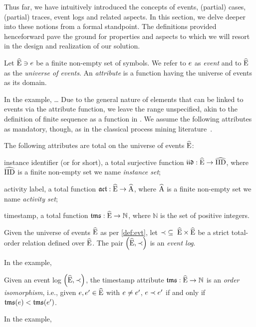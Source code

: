\begin{newj}
Thus far, we have intuitively introduced the concepts of events, (partial) cases, (partial) traces, event logs and related aspects.
In this section, we delve deeper into these notions from a formal standpoint. The definitions provided henceforward pave the ground for properties and aspects to which we will resort in the design and realization of our solution.

\begin{definition}[Event]\label{def:evt}
	Let $\widehat{\mathrm{E}} \ni e$ be a finite non-empty set of symbols. We refer to $e$ as \emph{event} and to $\widehat{\mathrm{E}}$ as the \emph{universe of events}.
	An \emph{attribute} is a function having the universe of events as its domain.
\end{definition}
%
In the example, \ldots{}
Due to the general nature of elements that can be linked to events via the attribute function, we leave the range unspecified, akin to the definition of finite sequence as a function in \cite{Mendelson/2015:IntroductionMathematicalLogic}. We assume the following attributes as mandatory, though, as in the classical process mining literature~\cite{Aalst/2016:ProcessMiningBook:DataScienceinAction}.
%
\begin{assumption}\label{asm:attribute}
	The following attributes are total on the universe of events $\widehat{\mathrm{E}}$:
	\begin{inparadesc}
		\item[instance identifier] (or {\CId} for short), a total surjective function $\mathfrak{iid} : \widehat{\mathrm{E}} \to \widehat{\mathrm{IID}}$, where $\widehat{\mathrm{IID}}$ is a finite non-empty set we name \emph{instance set};
		\item[activity label\textnormal{,}] a total function $\mathfrak{act} : \widehat{\mathrm{E}} \to \widehat{\mathrm{A}}$, where $\widehat{\mathrm{A}}$ is a finite non-empty set we name \emph{activity set};
		\item[timestamp\textnormal{,}] a total function $\mathfrak{tms} : \widehat{\mathrm{E}} \to \mathbb{N}$, where $\mathbb{N}$ is the set of positive integers.
	\end{inparadesc}
\end{assumption}

\begin{definition}\label{def:evt:log}
	Given the universe of events $\widehat{\mathrm{E}}$ as per \cref{def:evt}, let ${\prec \;\subseteq\; \widehat{\mathrm{E}} \times \widehat{\mathrm{E}}}$ be a strict total-order relation defined over $\widehat{\mathrm{E}}$.
	The pair $\left( \widehat{\mathrm{E}}, \prec \right)$ is an \emph{event log}.
\end{definition}
%
In the example,
%
\begin{assumption}\label{asm:order:timestamp}
	Given an event log $\left( \widehat{\mathrm{E}}, \prec \right)$, the timestamp attribute $\mathfrak{tms}: \widehat{\mathrm{E}} \to \mathbb{N}$ is an \textit{order isomorphism}, i.e., given $e, e' \in \widehat{\mathrm{E}}$ with $e \neq e'$, $e \prec e'$ if and only if $\mathfrak{tms}(e) < \mathfrak{tms}(e')$.
\end{assumption}
%
In the example,


\end{newj}
